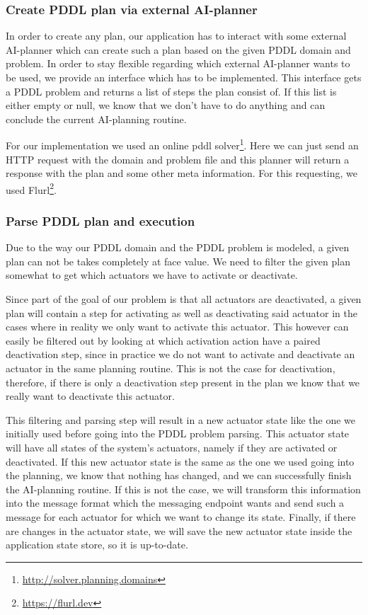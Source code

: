 \subsubsection{Create PDDL plan via external AI-planner}\label{subsubsec:create-pddl-plan-via-external-ai-planner}
In order to create any plan, our application has to interact with some external AI-planner which can create such a plan based on the given PDDL domain and problem.
In order to stay flexible regarding which external AI-planner wants to be used, we provide an interface which has to be implemented.
This interface gets a PDDL problem and returns a list of steps the plan consist of.
If this list is either empty or null, we know that we don't have to do anything and can conclude the current AI-planning routine.

For our implementation we used an online pddl solver\footnote{\url{http://solver.planning.domains}}.
Here we can just send an HTTP request with the domain and problem file and this planner will return a response with the plan and some other meta information.
For this requesting, we used Flurl\footnote{\url{https://flurl.dev}}.

\subsubsection{Parse PDDL plan and execution}\label{subsubsec:parse-pddl-plan-and-execution}
Due to the way our PDDL domain and the PDDL problem is modeled, a given plan can not be takes completely at face value.
We need to filter the given plan somewhat to get which actuators we have to activate or deactivate.

Since part of the goal of our problem is that all actuators are deactivated, a given plan will contain a step for activating as well as deactivating said actuator in the cases where in reality we only want to activate this actuator.
This however can easily be filtered out by looking at which activation action have a paired deactivation step, since in practice we do not want to activate and deactivate an actuator in the same planning routine.
This is not the case for deactivation, therefore, if there is only a deactivation step present in the plan we know that we really want to deactivate this actuator.

This filtering and parsing step will result in a new actuator state like the one we initially used before going into the PDDL problem parsing.
This actuator state will have all states of the system's actuators, namely if they are activated or deactivated.
If this new actuator state is the same as the one we used going into the planning, we know that nothing has changed, and we can successfully finish the AI-planning routine.
If this is not the case, we will transform this information into the message format which the messaging endpoint wants and send such a message for each actuator for which we want to change its state.
Finally, if there are changes in the actuator state, we will save the new actuator state inside the application state store, so it is up-to-date.
